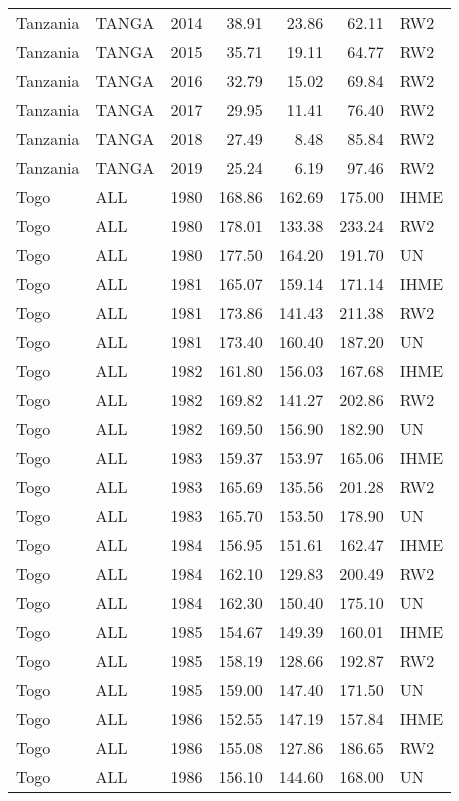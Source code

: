 \begin{longtable}{lllrrrl}
  Tanzania & TANGA & 2014 & 38.91 & 23.86 & 62.11 & RW2 \\ 
  Tanzania & TANGA & 2015 & 35.71 & 19.11 & 64.77 & RW2 \\ 
  Tanzania & TANGA & 2016 & 32.79 & 15.02 & 69.84 & RW2 \\ 
  Tanzania & TANGA & 2017 & 29.95 & 11.41 & 76.40 & RW2 \\ 
  Tanzania & TANGA & 2018 & 27.49 & 8.48 & 85.84 & RW2 \\ 
  Tanzania & TANGA & 2019 & 25.24 & 6.19 & 97.46 & RW2 \\ 
  Togo & ALL & 1980 & 168.86 & 162.69 & 175.00 & IHME \\ 
  Togo & ALL & 1980 & 178.01 & 133.38 & 233.24 & RW2 \\ 
  Togo & ALL & 1980 & 177.50 & 164.20 & 191.70 & UN \\ 
  Togo & ALL & 1981 & 165.07 & 159.14 & 171.14 & IHME \\ 
  Togo & ALL & 1981 & 173.86 & 141.43 & 211.38 & RW2 \\ 
  Togo & ALL & 1981 & 173.40 & 160.40 & 187.20 & UN \\ 
  Togo & ALL & 1982 & 161.80 & 156.03 & 167.68 & IHME \\ 
  Togo & ALL & 1982 & 169.82 & 141.27 & 202.86 & RW2 \\ 
  Togo & ALL & 1982 & 169.50 & 156.90 & 182.90 & UN \\ 
  Togo & ALL & 1983 & 159.37 & 153.97 & 165.06 & IHME \\ 
  Togo & ALL & 1983 & 165.69 & 135.56 & 201.28 & RW2 \\ 
  Togo & ALL & 1983 & 165.70 & 153.50 & 178.90 & UN \\ 
  Togo & ALL & 1984 & 156.95 & 151.61 & 162.47 & IHME \\ 
  Togo & ALL & 1984 & 162.10 & 129.83 & 200.49 & RW2 \\ 
  Togo & ALL & 1984 & 162.30 & 150.40 & 175.10 & UN \\ 
  Togo & ALL & 1985 & 154.67 & 149.39 & 160.01 & IHME \\ 
  Togo & ALL & 1985 & 158.19 & 128.66 & 192.87 & RW2 \\ 
  Togo & ALL & 1985 & 159.00 & 147.40 & 171.50 & UN \\ 
  Togo & ALL & 1986 & 152.55 & 147.19 & 157.84 & IHME \\ 
  Togo & ALL & 1986 & 155.08 & 127.86 & 186.65 & RW2 \\ 
  Togo & ALL & 1986 & 156.10 & 144.60 & 168.00 & UN \\ 

\end{longtable}
